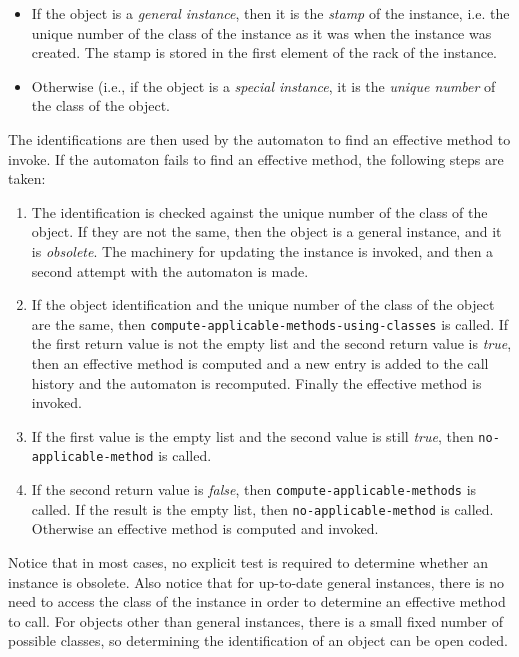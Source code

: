 \begin{itemize}
\item If the object is a \emph{general instance}, then it is the
  \emph{stamp} of the instance, i.e. the unique number of the class of
  the instance as it was when the instance was created.  The stamp is
  stored in the first element of the rack of the instance.
\item Otherwise (i.e., if the object is a \emph{special instance}, it
  is the \emph{unique number} of the class of the object.
\end{itemize}

The identifications are then used by the automaton to find an
effective method to invoke.  If the automaton fails to find an
effective method, the following steps are taken:

\begin{enumerate}
\item The identification is checked against the unique
  number of the class of the object.  If they are not the same, then
  the object is a general instance, and it is \emph{obsolete}.  The
  machinery for updating the instance is invoked, and then a second
  attempt with the automaton is made. 
\item If the object identification and the unique number of the
  class of the object are the same, then
  \texttt{compute-applicable-methods-using-classes} is called.  If the
  first return value is not the empty list and the second return value
  is \textit{true}, then an effective method is computed and a new
  entry is added to the call history and the automaton is recomputed.
  Finally the effective method is invoked.
\item If the first value is the empty list and the second value is
  still \textit{true}, then \texttt{no-applicable-method} is called.
\item If the second return value is \textit{false}, then 
 \texttt{compute-applicable-methods} is called.  If the result is the
 empty list, then \texttt{no-applicable-method} is called.  Otherwise
 an effective method is computed and invoked. 
\end{enumerate}

Notice that in most cases, no explicit test is required to determine
whether an instance is obsolete.  Also notice that for up-to-date
general instances, there is no need to access the class of the
instance in order to determine an effective method to call.  For
objects other than general instances, there is a small fixed number of
possible classes, so determining the identification of an object can
be open coded.

